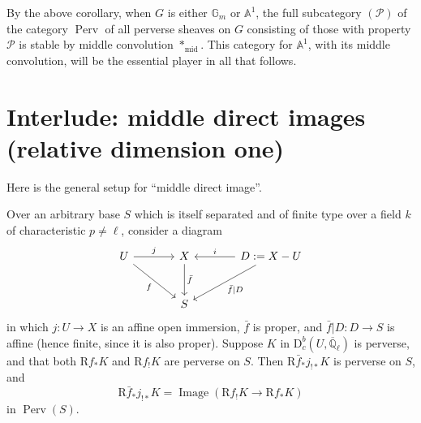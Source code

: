 By the above corollary, when \(G\) is either \(\mathbb{G}_m\) or
\(\mathbb{A}^1\), the full subcategory \((\mathcal{P})\) of the category
\(\operatorname{Perv}\) of all perverse sheaves on \(G\) consisting of those
with property \(\mathcal{P}\) is stable by middle convolution
\(*_{\mathrm{mid}}\). This category for \(\mathbb{A}^1\), with its middle
convolution, will be the essential player in all that follows.

\section{Interlude: middle direct images (relative dimension one)}\label{sec:2.7}

Here is the general setup for ``middle direct image''.

Over an arbitrary base \(S\) which is itself separated and of finite type over
a field \(k\) of characteristic \(p\neq\ell\), consider a diagram
\[
\begin{tikzcd}[column sep=large,row sep=large]
U \arrow[r,"j"] \arrow[dr,"f"'] &
X \arrow[d,"\bar{f}"] &
D:=X-U \arrow[l,"i"'] \arrow[dl,"\bar{f}|D"] \\
& S &
\end{tikzcd}
\]
in which \(j:U\to X\) is an affine open immersion, \(\bar{f}\) is proper, and
\(\bar{f}|D:D\to S\) is affine (hence finite, since it is also proper).
Suppose \(K\) in \(\mathrm{D}^b_c(U,\overline{\mathbb{Q}}_\ell)\) is perverse,
and that both \(\mathrm{R}f_*K\) and \(\mathrm{R}f_!K\) are perverse on \(S\).
Then \(\mathrm{R}\bar{f}_*j_{!*}K\) is perverse on \(S\), and
\[
  \mathrm{R}\bar{f}_*j_{!*}K
  =
  \operatorname{Image}(\mathrm{R}f_!K\to \mathrm{R}f_*K)
\]
in \(\operatorname{Perv}(S)\).

